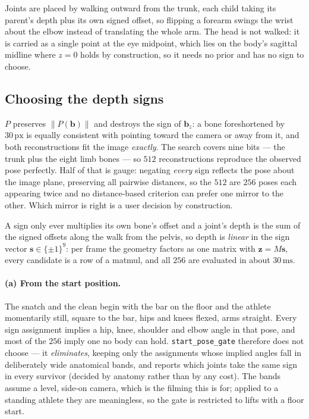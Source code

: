 \documentclass[10pt,a4paper]{article}
\begin{document}
Joints are placed by walking outward from the trunk, each child taking its
parent's depth plus its own signed offset, so flipping a forearm swings the
wrist about the elbow instead of translating the whole arm. The head is not
walked: it is carried as a single point at the eye midpoint, which lies on the
body's sagittal midline where $z=0$ holds by construction, so it needs no prior
and has no sign to choose.

\subsection{Choosing the depth signs}\label{sec:depth-sign}

$P$ preserves $\lVert P(\mathbf{b})\rVert$ and destroys the sign of
$\mathbf{b}_z$: a bone foreshortened by $30\,\mathrm{px}$ is equally consistent
with pointing toward the camera or away from it, and both reconstructions fit
the image \emph{exactly}. The search covers nine bits --- the trunk plus the
eight limb bones --- so $512$ reconstructions reproduce the observed pose
perfectly. Half of that is gauge: negating \emph{every} sign reflects the pose
about the image plane, preserving all pairwise distances, so the $512$ are
$256$ poses each appearing twice and no distance-based criterion can prefer one
mirror to the other. Which mirror is right is a user decision by construction.

A sign only ever multiplies its own bone's offset and a joint's depth is the
sum of the signed offsets along the walk from the pelvis, so depth is
\emph{linear} in the sign vector $\mathbf{s}\in\{\pm1\}^{9}$: per frame the
geometry factors as one matrix with $\mathbf{z}=M\mathbf{s}$, every candidate
is a row of a matmul, and all $256$ are evaluated in about $30\,\mathrm{ms}$.

\paragraph{(a) From the start position.} The snatch and the clean begin with
the bar on the floor and the athlete momentarily still, square to the bar, hips
and knees flexed, arms straight. Every sign assignment implies a hip, knee,
shoulder and elbow angle in that pose, and most of the $256$ imply one no body
can hold. \texttt{start\_pose\_gate} therefore does not choose --- it
\emph{eliminates}, keeping only the assignments whose implied angles fall in
deliberately wide anatomical bands, and reports which joints take the same sign
in every survivor (decided by anatomy rather than by any cost). The bands
assume a level, side-on camera, which is the filming this is for; applied to a
standing athlete they are meaningless, so the gate is restricted to lifts with
a floor start.
\end{document}
